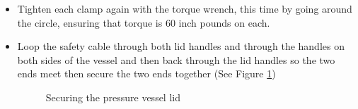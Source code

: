 \documentclass[letterpaper,11pt]{article}
\begin{document}
\begin{enumerate}
\begin{itemize}
            the back of each clamp (See Figure \ref{fig:sec_lid}) using a 
            torque wrench, tightening each clamp until the torque reads 
            60 inch pounds
            \item Tighten each clamp again with the torque wrench, this time by 
            going around the circle, ensuring that torque is 60 inch pounds on 
            each.
        \item Loop the safety cable through both lid handles and through the 
            handles on both sides of the vessel and then back through the lid 
            handles so the two ends meet then secure the two ends together 
            (See Figure \ref{fig:sec_lid})

\begin{figure}[H]
    \centering
    \caption{Securing the pressure vessel lid}
    \label{fig:sec_lid}
\end{figure}


\end{itemize}
\end{enumerate}
\end{document}
